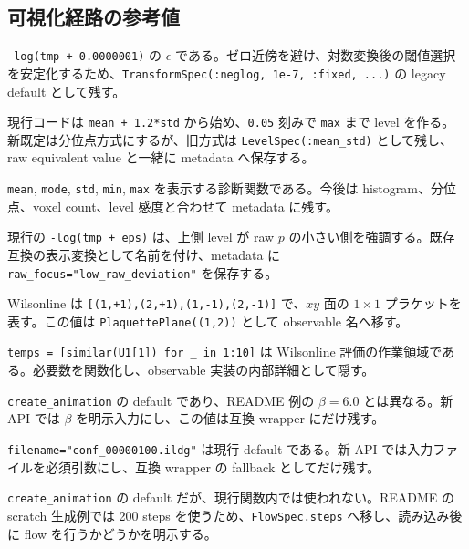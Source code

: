 \documentclass[uplatex,dvipdfmx,ja=standard,11pt,a4paper]{bxjsarticle}
\newcommand{\code}[1]{\texttt{#1}}
\begin{document}
\subsection{可視化経路の参考値}
\begin{description}[style=nextline,leftmargin=7em,labelwidth=6em]
  \item[\(10^{-7}\)] \code{-log(tmp + 0.0000001)} の \(\epsilon\) である。ゼロ近傍を避け、対数変換後の閾値選択を安定化するため、\code{TransformSpec(:neglog, 1e-7, :fixed, ...)} の legacy default として残す。
  \item[\(1.2\sigma\) と \(0.05\)] 現行コードは \code{mean + 1.2*std} から始め、\code{0.05} 刻みで \code{max} まで level を作る。新既定は分位点方式にするが、旧方式は \code{LevelSpec(:mean\_std)} として残し、raw equivalent value と一緒に metadata へ保存する。
  \item[\code{automatic\_level2}] \code{mean}, \code{mode}, \code{std}, \code{min}, \code{max} を表示する診断関数である。今後は histogram、分位点、voxel count、level 感度と合わせて metadata に残す。
  \item[\code{:neglog}] 現行の \code{-log(tmp + eps)} は、上側 level が raw \(p\) の小さい側を強調する。既存互換の表示変換として名前を付け、metadata に \code{raw\_focus="low\_raw\_deviation"} を保存する。
  \item[\code{xy} plaquette] Wilsonline は \code{[(1,+1),(2,+1),(1,-1),(2,-1)]} で、\(xy\) 面の \(1\times1\) プラケットを表す。この値は \code{PlaquettePlane((1,2))} として observable 名へ移す。
  \item[作業配列 10個] \code{temps = [similar(U1[1]) for \_ in 1:10]} は Wilsonline 評価の作業領域である。必要数を関数化し、observable 実装の内部詳細として隠す。
  \item[\code{beta=6.1}] \code{create\_animation} の default であり、README 例の \(\beta=6.0\) とは異なる。新 API では \(\beta\) を明示入力にし、この値は互換 wrapper にだけ残す。
  \item[既定ファイル名] \code{filename="conf\_00000100.ildg"} は現行 default である。新 API では入力ファイルを必須引数にし、互換 wrapper の fallback としてだけ残す。
  \item[\code{flow\_steps\_in=200}] \code{create\_animation} の default だが、現行関数内では使われない。README の scratch 生成例では 200 steps を使うため、\code{FlowSpec.steps} へ移し、読み込み後に flow を行うかどうかを明示する。
\end{description}
\end{document}
